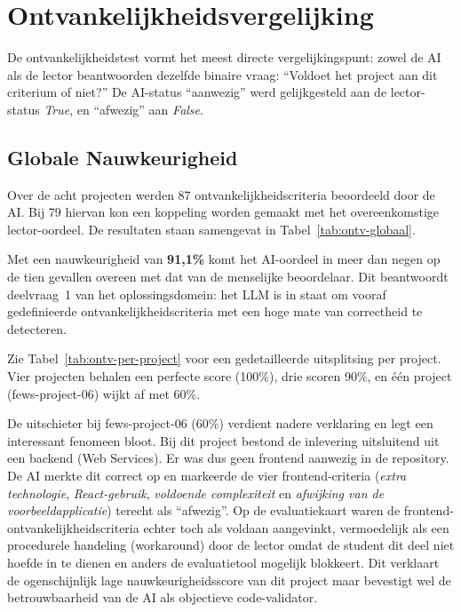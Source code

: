 \section{Ontvankelijkheidsvergelijking}
\label{sec:ontv-vergelijking}

De ontvankelijkheidstest vormt het meest directe vergelijkingspunt: zowel de AI als de lector beantwoorden dezelfde binaire vraag: ``Voldoet het project aan dit criterium of niet?'' De AI-status ``aanwezig'' werd gelijkgesteld aan de lector-status \textit{True}, en ``afwezig'' aan \textit{False}.

\subsection{Globale Nauwkeurigheid}

Over de acht projecten werden 87 ontvankelijkheidscriteria beoordeeld door de AI. Bij 79 hiervan kon een koppeling worden gemaakt met het overeenkomstige lector-oordeel. De resultaten staan samengevat in Tabel~\ref{tab:ontv-globaal}.

\vspace{1em}

Met een nauwkeurigheid van \textbf{91,1\%} komt het AI-oordeel in meer dan negen op de tien gevallen overeen met dat van de menselijke beoordelaar. Dit beantwoordt deelvraag~1 van het oplossingsdomein: het LLM is in staat om vooraf gedefinieerde ontvankelijkheidscriteria met een hoge mate van correctheid te detecteren.

\vspace{1em}

Zie Tabel~\ref{tab:ontv-per-project} voor een gedetailleerde uitsplitsing per project. Vier projecten behalen een perfecte score (100\%), drie scoren 90\%, en één project (fews-project-06) wijkt af met 60\%.

\vspace{1em}

De uitschieter bij fews-project-06 (60\%) verdient nadere verklaring en legt een interessant fenomeen bloot. Bij dit project bestond de inlevering uitsluitend uit een backend (Web Services). Er was dus geen frontend aanwezig in de repository. De AI merkte dit correct op en markeerde de vier frontend-criteria (\textit{extra technologie}, \textit{React-gebruik}, \textit{voldoende complexiteit} en \textit{afwijking van de voorbeeldapplicatie}) terecht als ``afwezig''. Op de evaluatiekaart waren de frontend-ontvankelijkheidscriteria echter toch als voldaan aangevinkt, vermoedelijk als een procedurele handeling (workaround) door de lector omdat de student dit deel niet hoefde in te dienen en anders de evaluatietool mogelijk blokkeert. Dit verklaart de ogenschijnlijk lage nauwkeurigheidsscore van dit project maar bevestigt wel de betrouwbaarheid van de AI als objectieve code-validator.

